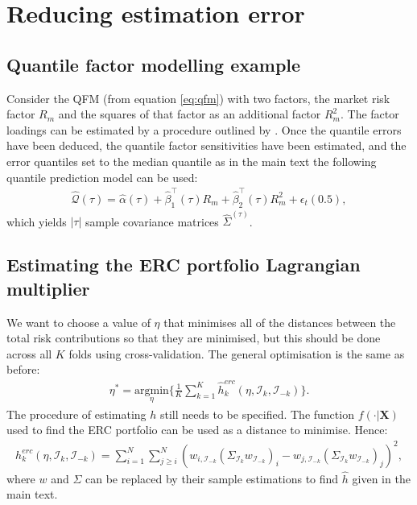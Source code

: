 \documentclass[
]{article}
\begin{document}
\hypertarget{reducing-estimation-error}{%
\section{Reducing estimation error}\label{reducing-estimation-error}}

\hypertarget{qfmexample}{%
\subsection{Quantile factor modelling example}\label{qfmexample}}

Consider the QFM (from equation \eqref{eq:qfm}) with two factors, the market risk factor \(R_m\) and the
squares of that factor as an additional factor \(R_m^2\). The factor loadings can be estimated by a
procedure outlined by \citet{KB78}. Once the quantile errors have been deduced, the quantile factor
sensitivities have been estimated, and the error quantiles set to the median quantile as in the main
text the following quantile prediction model can be used:
\begin{align}
\hat{\mathcal{Q}}(\tau) = \hat{\alpha} (\tau) + \hat{\beta}_1^\intercal(\tau)R_m + \hat{\beta}_2^\intercal(\tau)R_m^2 + \epsilon_t(0.5),
\end{align}
which yields \(|\tau|\) sample covariance matrices \(\hat{\Sigma}^{(\tau)}\).

\hypertarget{etaest}{%
\subsection{Estimating the ERC portfolio Lagrangian multiplier}\label{etaest}}

We want to choose a value of \(\eta\) that minimises all of the distances between the total risk
contributions so that they are minimised, but this should be done across all \(K\) folds using
cross-validation. The general optimisation is the same as before:
\begin{align}
\eta^* = \underset{\eta}{\text{argmin}} \Big \{ \frac{1}{K} \sum_{k = 1}^K \hat{h}_k^{erc}(\eta, \mathcal{I}_k, \mathcal{I}_{-k})\Big \}.
\end{align}
The procedure of estimating \(h\) still needs to be specified. The function \(f(\cdot|\textbf{X})\) used
to find the ERC portfolio can be used as a distance to minimise. Hence:
\begin{align}
h_k^{erc}(\eta, \mathcal{I}_k, \mathcal{I}_{-k}) = \sum_{i = 1}^N  \sum_{j \geq i}^N(w_{i, \mathcal{I}_{-k}}(\Sigma_{\mathcal{I}_k} w_{\mathcal{I}_{-k}})_i - w_{j, \mathcal{I}_{-k}}(\Sigma_{\mathcal{I}_k} w_{\mathcal{I}_{-k}})_j )^2,
\end{align}
where \(w\) and \(\Sigma\) can be replaced by their sample estimations to find \(\hat{h}\) given in the
main text.

  
\end{document}

